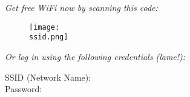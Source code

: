 \documentclass[a4paper,12pt]{article}
\newlength{\credlen}
\begin{document}
\begin{center}
  \textsl{\Large Get free WiFi now by scanning this code:}
\end{center}
\begin{figure}[h]
\centering
\texttt{[image: \\ssid.png]}
\end{figure}

\begin{center}
\begin{minipage}{\credlen}
\noindent \textsl{Or log in using the following credentials (lame!):}

\begin{tabbing}
  SSID (Network Name): \= \textbf{\ssid}\\
  Password: \> \textbf{\pw}\\
\end{tabbing}
\end{minipage}
\end{center}
\end{document}
